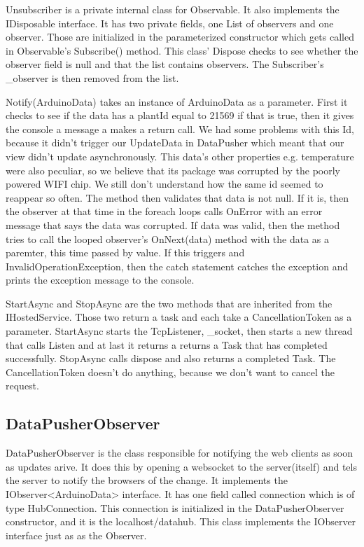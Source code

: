 \documentclass[a4paper,12pt,oneside,openright,titlepage]{book}
\begin{document}
Unsubscriber is a private internal class for Observable. It also implements the IDisposable interface.  It has two private fields, one List of observers and one observer. Those are initialized in the parameterized constructor which gets called in Observable's Subscribe() method. This class' Dispose checks to see whether the observer field is null and that the list contains observers. The Subscriber's \_observer is then removed from the list.

Notify(ArduinoData) takes an instance of ArduinoData as a parameter. First it checks to see if the data has a plantId equal to 21569 if that is true, then it gives the console a message a makes a return call. We had some problems with this Id, because it didn't trigger our UpdateData in DataPusher which meant that our view didn't update asynchronously. This data's other properties e.g. temperature were also peculiar, so we believe that its package was corrupted by the poorly powered WIFI chip. We still don't understand how the same id seemed to reappear so often. 
The method then validates that data is not null. If it is, then the observer at that time in the foreach loops calls OnError with an error message that says the data was corrupted. If data was valid, then the method tries to call the looped observer's OnNext(data) method with the data as a paremter, this time passed by value. If this triggers and InvalidOperationException, then the catch statement catches the exception and prints the exception message to the console. 

StartAsync and StopAsync are the two methods that are inherited from the IHostedService. Those two return a task and each take a CancellationToken as a parameter. StartAsync starts the TcpListener, \_socket, then starts a new thread that calls Listen and at last it returns a returns a Task that has completed successfully. StopAsync calls dispose and also returns a completed Task. The CancellationToken doesn't do anything, because we don't want to cancel the request.


\subsection{DataPusherObserver}

DataPusherObserver is the class responsible for notifying the web clients as soon as updates arive. It does this by opening a websocket to the server(itself) and tels the server to notify the browsers of the change. It implements the IObserver<ArduinoData> interface. It has one field called connection which is of type HubConnection. This connection is initialized in the DataPusherObserver constructor, and it is the localhost/datahub. This class implements the IObserver interface just as as the Observer.
\end{document}
